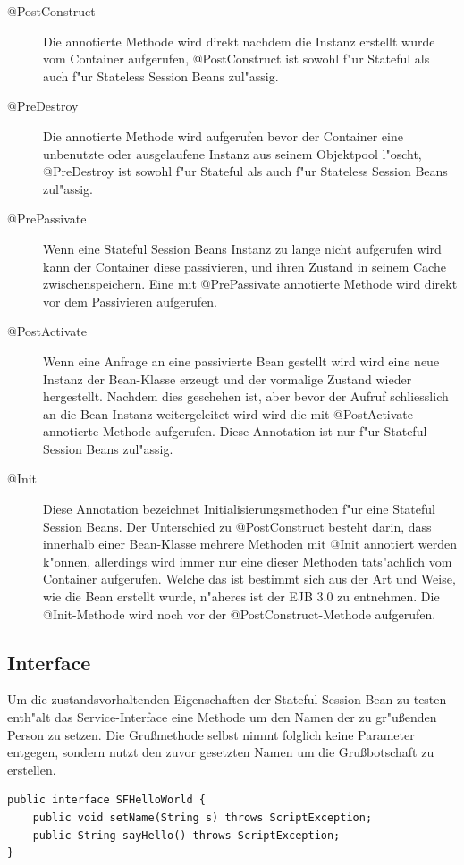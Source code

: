 \begin{description}
\item[@PostConstruct]
Die annotierte Methode wird direkt nachdem die Instanz erstellt wurde vom Container aufgerufen, @PostConstruct ist sowohl
f"ur Stateful als auch f"ur Stateless Session Beans zul"assig.
\item[@PreDestroy]
Die annotierte Methode wird aufgerufen bevor der Container eine unbenutzte oder ausgelaufene Instanz aus seinem Objektpool
l"oscht, @PreDestroy ist sowohl f"ur Stateful als auch f"ur Stateless Session Beans zul"assig.
\item[@PrePassivate]
Wenn eine Stateful Session Beans Instanz zu lange nicht aufgerufen wird kann der Container diese passivieren, und ihren
Zustand in seinem Cache zwischenspeichern. Eine mit @PrePassivate annotierte Methode wird direkt vor dem Passivieren aufgerufen.
\item[@PostActivate]
Wenn eine Anfrage an eine passivierte Bean gestellt wird wird eine neue Instanz der Bean-Klasse erzeugt und der vormalige
Zustand wieder hergestellt. Nachdem dies geschehen ist, aber bevor der Aufruf schliesslich an die Bean-Instanz weitergeleitet
wird wird die mit @PostActivate annotierte Methode aufgerufen. Diese Annotation ist nur f"ur Stateful Session Beans zul"assig.
\item[@Init]
Diese Annotation bezeichnet Initialisierungsmethoden f"ur eine Stateful Session Beans. Der Unterschied zu @PostConstruct
besteht darin, dass innerhalb einer Bean-Klasse mehrere Methoden mit @Init annotiert werden k"onnen, allerdings wird immer nur
eine dieser Methoden tats"achlich vom Container aufgerufen. Welche das ist bestimmt sich aus der Art und Weise, wie die
Bean erstellt wurde, n"aheres ist der EJB 3.0 \cite{EJBHP} zu entnehmen. Die @Init-Methode wird noch vor der 
@PostConstruct-Methode aufgerufen.
\end{description}


\subsection{Interface}
\label{sec:chap2:sfsb:if}

Um die zustandsvorhaltenden Eigenschaften der Stateful Session Bean zu testen enth"alt das Service-Interface eine Methode 
um den Namen der zu gr"u\ss enden Person zu setzen. Die Gru\ss methode selbst nimmt folglich keine Parameter entgegen, sondern
nutzt den zuvor gesetzten Namen um die Gru\ss botschaft zu erstellen.
\begin{lstlisting}[caption=Stateful Hello World Interface]
public interface SFHelloWorld {
    public void setName(String s) throws ScriptException;
    public String sayHello() throws ScriptException;
}
\end{lstlisting}

